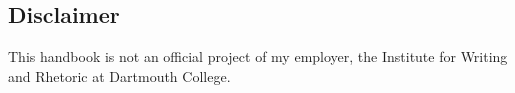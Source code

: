 

\newpage

\begin{center}\section*{Disclaimer}\end{center}
\bigskip
This handbook is not an official project of my employer, the Institute for Writing and Rhetoric at Dartmouth College.




\bigskip


\vfill

\newpage


